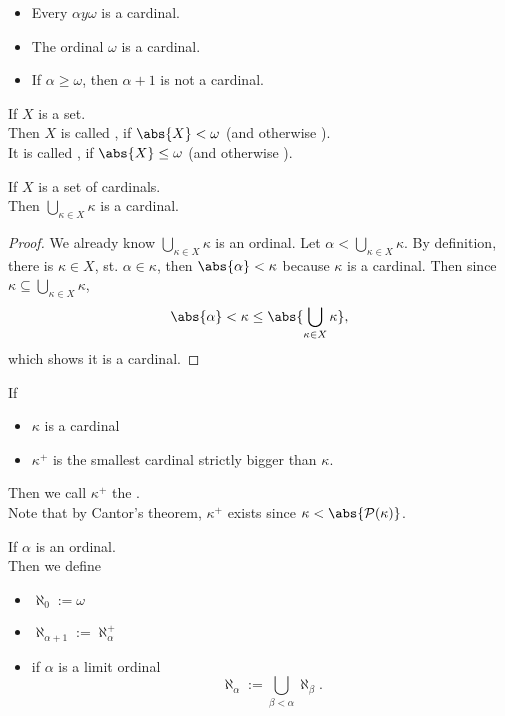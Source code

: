 \begin{proposition}
    \begin{itemize}
        \item Every $\alpha y \omega$ is a cardinal.
        \item The ordinal $\omega$ is a cardinal.
        \item If $\alpha \geq \omega$, then $\alpha + 1$ is not a cardinal.
    \end{itemize}
\end{proposition}

\begin{definition}
    If $X$ is a set.\\
    Then $X$ is called , if $\abs{X} < \omega$ (and otherwise ).\\
    It is called , if $\abs{X} \leq \omega$ (and otherwise ).
\end{definition}


\begin{proposition}
    If $X$ is a set of cardinals.\\
    Then $\bigcup_{\kappa \in X} \kappa$ is a cardinal.
\end{proposition}
\begin{proof}
    We already know $\bigcup_{\kappa \in X} \kappa$ is an ordinal.
    Let $\alpha < \bigcup_{\kappa \in X} \kappa$. By definition, there is $\kappa \in X$, st.
    $ \alpha \in \kappa$, then $\abs{\alpha} < \kappa$ because $\kappa$ is a cardinal.
    Then since $\kappa \subseteq \bigcup_{\kappa \in X} \kappa$,
    $$ \abs{\alpha} < \kappa \leq \abs{\bigcup_{\kappa \in X} \kappa},$$
    which shows it is a cardinal.
\end{proof}

\begin{definition}
    If 
    \begin{itemize}
        \item $\kappa$ is a cardinal
        \item $\kappa^+$ is the smallest cardinal strictly bigger than $\kappa$.
    \end{itemize}
    Then we call $\kappa^+$ the .\\
    Note that by Cantor's theorem, $\kappa^+$ exists since $\kappa < \abs{\mathcal{P}(\kappa)}$.
\end{definition}

\begin{definition}
    If $\alpha$ is an ordinal.\\
    Then we define
    \begin{itemize}
        \item $\aleph_0:= \omega$
        \item $\aleph_{\alpha + 1} := \aleph_{\alpha}^+$
        \item if $\alpha$ is a limit ordinal
        $$ \aleph_\alpha := \bigcup_{\beta < \alpha} \aleph_\beta.$$
    \end{itemize}
\end{definition}

